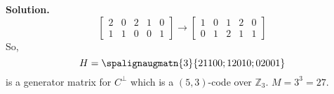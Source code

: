 \begin{exbox}
\begin{example}
        \textbf{Solution.}
        \[\begin{bmatrix}
                2 & 0 & 2 & 1 & 0 \\
                1 & 1 & 0 & 0 & 1
            \end{bmatrix}\rightarrow
            \begin{bmatrix}
                1 & 0 & 1 & 2 & 0 \\
                0 & 1 & 2 & 1 & 1
            \end{bmatrix}\]
        So,
        \[ H=
            \spalignaugmatn{3}{
                2 1 1 0 0;
                1 2 0 1 0;
                0 2 0 0 1
            }
        \]
        is a generator matrix for $ C^{\perp} $ which is a $ (5,3) $-code
        over $ \mathbb{Z}_3 $. $ M=3^3=27 $.
    \end{example}
\end{exbox}
